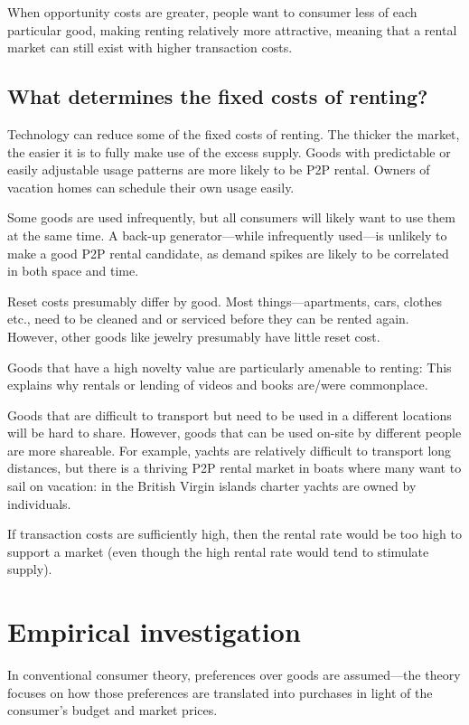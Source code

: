 \documentclass[11pt]{article}
\begin{document}
When opportunity costs are greater, people want to consumer less of each particular good, making renting relatively more attractive, meaning that a rental market can still exist with higher transaction costs. 

\subsection{What determines the fixed costs of renting?} 
Technology can reduce some of the fixed costs of renting. 
The thicker the market, the easier it is to fully make use of the excess supply. 
Goods with predictable or easily adjustable usage patterns are more likely to be P2P rental. 
Owners of vacation homes can schedule their own usage easily. 

Some goods are used infrequently, but all consumers will likely want to use them at the same time. 
A back-up generator---while infrequently used---is unlikely to make a
good P2P rental candidate, as demand spikes are likely to be correlated in both space and time. 

Reset costs presumably differ by good. 
Most things---apartments, cars, clothes etc., need to be cleaned and or serviced before they can be rented again. 
However, other goods like jewelry presumably have little reset cost.

Goods that have a high novelty value are particularly amenable to renting: 
This explains why rentals or lending of videos and books are/were commonplace.  

Goods that are difficult to transport but need to be used in a different locations will be hard to share. 
However, goods that can be used on-site by different people are more shareable. 
For example, yachts are relatively difficult to transport long distances, but there is a thriving P2P rental market in boats where many want to sail on vacation: 
in the British Virgin islands charter yachts are owned by individuals. 

If transaction costs are sufficiently high, then the rental rate would be too high to support a market (even though the high rental rate would tend to stimulate supply). 

\section{Empirical investigation} 

In conventional consumer theory, preferences over goods are assumed---the theory focuses on how those preferences are translated into purchases in light of the consumer's budget and market prices. 
\end{document}
